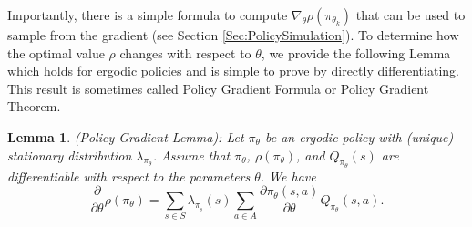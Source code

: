 \documentclass[letter,11pt]{article}
\newtheorem{lemma}{Lemma}[section]
\begin{document}
Importantly, there is a simple formula to compute $\nabla_\theta \rho(\pi_{\theta_k})$ that can be used to sample from the gradient (see Section \ref{Sec:PolicySimulation}). 
To determine how the optimal value $\rho$ changes with respect to $\theta$, we provide the following Lemma which holds for ergodic policies and is simple to prove by directly differentiating. This result is sometimes called Policy Gradient Formula or Policy Gradient Theorem.  
\begin{lemma} \label{Lemma:PolicyGrad} (Policy Gradient Lemma): Let $\pi_{\theta}$ be an ergodic policy with (unique) stationary distribution $\lambda _{ \pi_{\theta}}$. Assume that $\pi_{\theta}$, $\rho(\pi_{\theta} )$, and $Q_{\pi_{\theta}}(s)$ are differentiable with respect to the parameters $\theta$.  
We have 
\begin{equation} \label{Eq:PolicyGrad}
    \frac{\partial }{\partial \theta} \rho (\pi_{\theta} ) = \sum_{s \in S } \lambda_{{\pi _{ _{\theta}} } } (s) \sum_{a \in A}  \frac{\partial \pi_\theta(s, a)}{\partial \theta} Q_{\pi_\theta}(s, a).
\end{equation}
    
\end{lemma}
    
\end{document}
